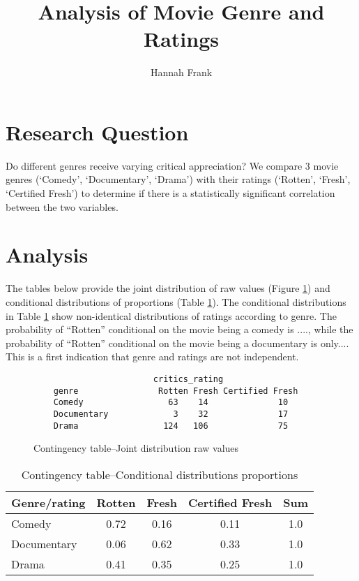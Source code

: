 \documentclass[12pt,a4paper]{article}
\author{Hannah Frank}
\title{Analysis of Movie Genre and Ratings}
\begin{document}

\maketitle %
	
\section{Research Question} %
Do different genres receive varying critical appreciation? We compare 3 movie genres (`Comedy', `Documentary', `Drama') with their ratings (`Rotten', `Fresh', `Certified Fresh') to determine if there is a statistically significant correlation between the two variables.

\section{Analysis}
The tables below provide the joint distribution of raw values (Figure \ref{tab:tab}) and conditional distributions of proportions (Table \ref{tab:prob_tab}). The  conditional distributions in Table \ref{tab:prob_tab}  show non-identical distributions of ratings according to genre. The probability of ``Rotten'' conditional on the movie being a comedy is ...., while the probability of ``Rotten'' conditional on the movie being a documentary is only.... This is a first indication that genre and ratings are not independent. 
	
\begin{figure}[H] %
\begin{verbatim} 
	                    critics_rating
	genre                Rotten Fresh Certified Fresh
	Comedy                 63    14              10
	Documentary             3    32              17
	Drama                 124   106              75
\end{verbatim}
\caption{Contingency table--Joint distribution raw values}
\label{tab:tab}
\end{figure}

\begin{table}[H] %
\centering
\begin{tabular}{lcccc} 
\hline
Genre/rating & Rotten & Fresh & Certified Fresh & Sum \\ 
\hline
Comedy & 0.72 & 0.16 & 0.11 &1.0 \\ 
Documentary & 0.06 & 0.62 &  0.33 & 1.0 \\
Drama & 0.41 & 0.35 & 0.25 &1.0 \\
\hline
\end{tabular}
\caption{Contingency table--Conditional distributions proportions}
\label{tab:prob_tab}
\end{table}
\end{document}
